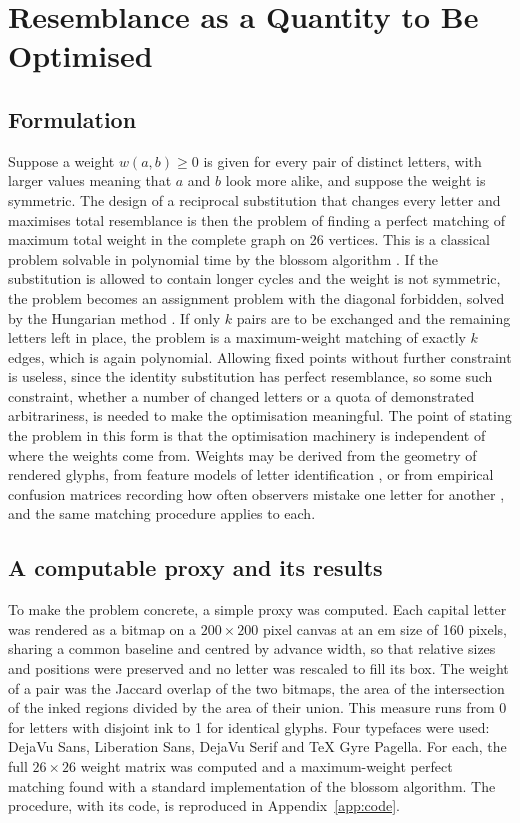 \section{Resemblance as a Quantity to Be Optimised}\label{sec:resemblance}

\subsection{Formulation}

Suppose a weight $w(a,b)\ge0$ is given for every pair of distinct letters, with larger values meaning that $a$ and $b$ look more alike, and suppose the weight is symmetric. The design of a reciprocal substitution that changes every letter and maximises total resemblance is then the problem of finding a perfect matching of maximum total weight in the complete graph on 26 vertices. This is a classical problem solvable in polynomial time by the blossom algorithm \citep{edmonds1965}. If the substitution is allowed to contain longer cycles and the weight is not symmetric, the problem becomes an assignment problem with the diagonal forbidden, solved by the Hungarian method \citep{kuhn1955}. If only $k$ pairs are to be exchanged and the remaining letters left in place, the problem is a maximum-weight matching of exactly $k$ edges, which is again polynomial. Allowing fixed points without further constraint is useless, since the identity substitution has perfect resemblance, so some such constraint, whether a number of changed letters or a quota of demonstrated arbitrariness, is needed to make the optimisation meaningful. The point of stating the problem in this form is that the optimisation machinery is independent of where the weights come from. Weights may be derived from the geometry of rendered glyphs, from feature models of letter identification \citep{pelli2006}, or from empirical confusion matrices recording how often observers mistake one letter for another \citep{townsend1971,gilmore1979}, and the same matching procedure applies to each.

\subsection{A computable proxy and its results}

To make the problem concrete, a simple proxy was computed. Each capital letter was rendered as a bitmap on a $200\times200$ pixel canvas at an em size of 160 pixels, sharing a common baseline and centred by advance width, so that relative sizes and positions were preserved and no letter was rescaled to fill its box. The weight of a pair was the Jaccard overlap of the two bitmaps, the area of the intersection of the inked regions divided by the area of their union. This measure runs from 0 for letters with disjoint ink to 1 for identical glyphs. Four typefaces were used: DejaVu Sans, Liberation Sans, DejaVu Serif and TeX Gyre Pagella. For each, the full $26\times26$ weight matrix was computed and a maximum-weight perfect matching found with a standard implementation of the blossom algorithm. The procedure, with its code, is reproduced in Appendix~\ref{app:code}.

